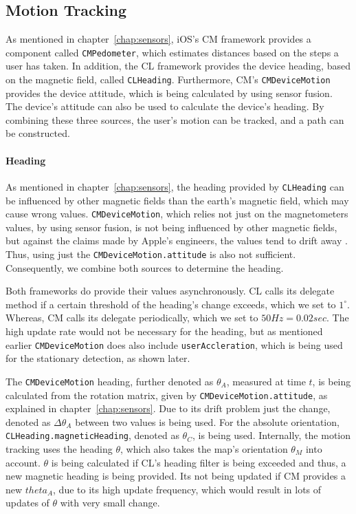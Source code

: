 \subsection{Motion Tracking}
As mentioned in chapter~\ref{chap:sensors}, iOS's \ac{CM} framework provides a component called \texttt{CMPedometer}, which estimates distances based on the steps a user has taken. In addition, the \ac{CL} framework provides the device heading, based on the magnetic field, called \texttt{CLHeading}. Furthermore, \ac{CM}'s \texttt{CMDeviceMotion} provides the device attitude, which is being calculated by using sensor fusion. The device's attitude can also be used to calculate the device's heading. By combining these three sources, the user's motion can be tracked, and a path can be constructed.

\paragraph{Heading}
As mentioned in chapter~\ref{chap:sensors}, the heading provided by \texttt{CLHeading} can be influenced by other magnetic fields than the earth's magnetic field, which may cause wrong values. \texttt{CMDeviceMotion}, which relies not just on the magnetometers values, by using sensor fusion, is not being influenced by other magnetic fields, but against the claims made by Apple's engineers, the values tend to drift away \citep{apple:wwdc_2014_pham}. Thus, using just the \texttt{CMDeviceMotion.attitude} is also not sufficient. Consequently, we combine both sources to determine the heading. %

Both frameworks do provide their values asynchronously. \acs{CL} calls its delegate method if a certain threshold of the heading's change exceeds, which we set to $1^\circ$. Whereas, \acs{CM} calls its delegate periodically, which we set to $50 Hz = 0.02 sec$. The high update rate would not be necessary for the heading, but as mentioned earlier \texttt{CMDeviceMotion} does also include \texttt{userAccleration}, which is being used for the stationary detection, as shown later.

The \texttt{CMDeviceMotion} heading, further denoted as $\theta_A$, measured at time $t$, is being calculated from the rotation matrix, given by \texttt{CMDeviceMotion.attitude}, as explained in chapter~\ref{chap:sensors}. Due to its drift problem just the change, denoted as $\Delta\theta_A$ between two values is being used. For the absolute orientation, \texttt{CLHeading.magneticHeading}, denoted as $\theta_C$, is being used. Internally, the motion tracking uses the heading $\theta$, which also takes the map's orientation $\theta_M$ into account. $\theta$ is being calculated if \acs{CL}'s heading filter is being exceeded and thus, a new magnetic heading is being provided. Its not being updated if \acs{CM} provides a new $theta_A$, due to its high update frequency, which would result in lots of updates of $\theta$ with very small change.

